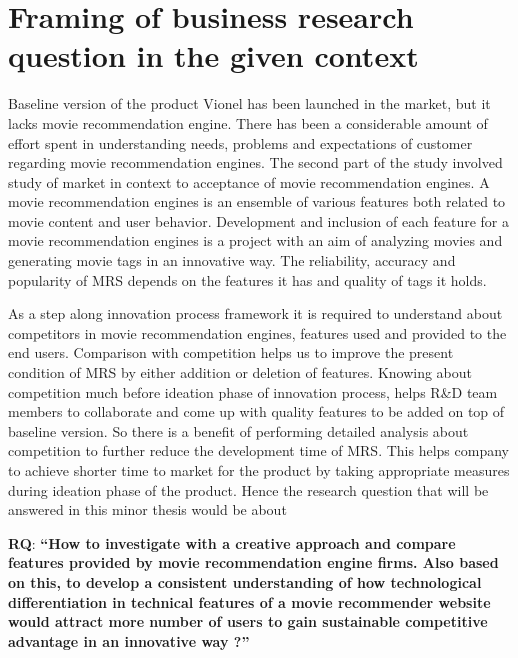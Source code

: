 
 
 
 

\section{Framing of business research question in the given context}
 Baseline version of the product Vionel has been launched in the market, but it lacks movie recommendation engine. There has been a considerable amount of effort spent in understanding needs, problems and expectations of customer regarding movie recommendation engines. The second part of the study involved study of market in context to acceptance of movie recommendation engines. A movie recommendation engines is an ensemble of various features both related to movie content and user behavior. Development and inclusion of each feature for a movie recommendation engines is a project with an aim of analyzing movies and generating movie tags in an innovative way. The reliability, accuracy and popularity of \acrshort{MRS} depends on the features it has and quality of tags it holds. 

 As a step along innovation process framework it is required to understand about competitors in movie recommendation engines, features used and provided to the end users. Comparison with competition helps us to improve the present condition of \acrshort{MRS} by either addition or deletion of features. Knowing about competition much before ideation phase of innovation process, helps R\&D team members to collaborate and come up with quality features to be added on top of baseline version. So there is a benefit of performing detailed analysis about competition to further reduce the development time of \acrshort{MRS}. This helps company to achieve shorter time to market for the product by taking appropriate measures during ideation phase of the product. Hence the research question that will be answered in this minor thesis would be about  

 \textbf{RQ}: \textbf{``How to investigate with a creative approach and compare features provided by movie recommendation engine firms. Also based on this, to develop a consistent understanding of how technological differentiation in technical features of a movie recommender website would attract more number of users to gain sustainable competitive advantage in an innovative way ?''}